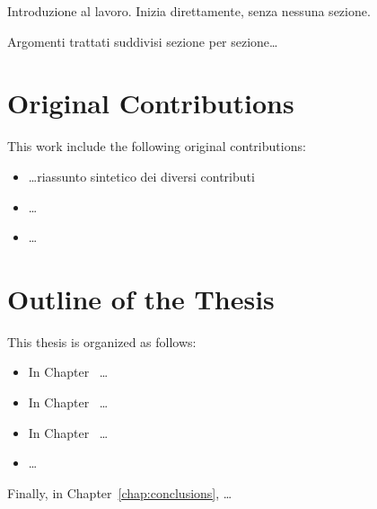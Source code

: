 Introduzione al lavoro. Inizia direttamente, senza nessuna sezione.

\noindent Argomenti trattati suddivisi sezione per sezione\dots

\section*{Original Contributions}
This work include the following original contributions:
\begin{itemize}
\item \dots riassunto sintetico dei diversi contributi
\item \dots
\item \dots
\end{itemize}

\section*{Outline of the Thesis}
This thesis is organized as follows: 
\begin{itemize}
\item In Chapter~ \dots
\item In Chapter~ \dots
\item In Chapter~ \dots
\item \dots
\end{itemize}
Finally, in Chapter~\ref{chap:conclusions}, \dots


